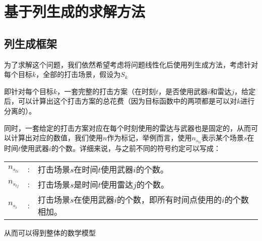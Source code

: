 \section{基于列生成的求解方法}
\subsection{列生成框架}
为了求解这个问题，我们依然希望考虑将问题线性化后使用列生成方法，考虑针对每个目标$k$，全部的打击场景，假设为$S_k$

即针对每个目标$k$，一套完整的打击方案（在时刻$t$，是否使用武器$i$和雷达$j$，给定后，可以计算出这个打击方案的总花费（因为目标函数中的两项都是可以对$k$进行分离的）。

同时，一套给定的打击方案对应在每个时刻使用的雷达与武器也是固定的，从而可以计算出对应的数值，我们使用$n$作为标记，举例而言，使用$n_{s_{ti}}$表示某个场景$s$在时间$t$使用武器$i$的个数。详细来说，与之前不同的符号约定可以写成：
\begin{table}[ht]
    \begin{tabularx}{\textwidth}{llX}
        $n_{s_{ti}}$ & : & 打击场景$s$在时间$t$使用武器$i$的个数。\\
        $n_{s_{tj}}$ & : & 打击场景$s$是时间$t$使用雷达$j$的个数。\\
        $n_{s_{i}}$ & : & 打击场景$s$在使用武器$i$的个数，即所有时间点使用的$i$的个数相加。
    \end{tabularx}
\end{table}

从而可以得到整体的数学模型

